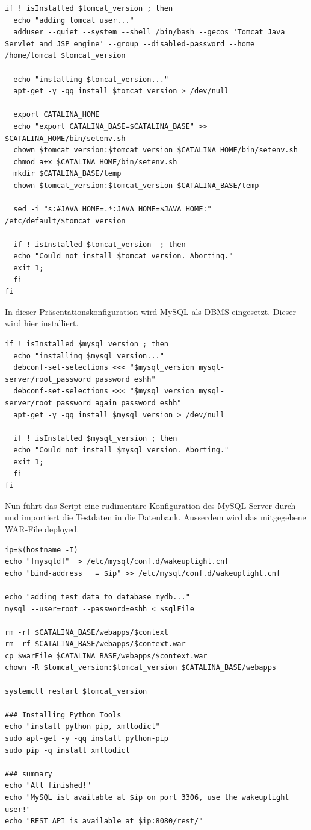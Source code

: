 \documentclass[]{article}
\begin{document}
\begin{verbatim}
if ! isInstalled $tomcat_version ; then
  echo "adding tomcat user..."
  adduser --quiet --system --shell /bin/bash --gecos 'Tomcat Java Servlet and JSP engine' --group --disabled-password --home /home/tomcat $tomcat_version

  echo "installing $tomcat_version..."
  apt-get -y -qq install $tomcat_version > /dev/null

  export CATALINA_HOME
  echo "export CATALINA_BASE=$CATALINA_BASE" >> $CATALINA_HOME/bin/setenv.sh
  chown $tomcat_version:$tomcat_version $CATALINA_HOME/bin/setenv.sh
  chmod a+x $CATALINA_HOME/bin/setenv.sh
  mkdir $CATALINA_BASE/temp
  chown $tomcat_version:$tomcat_version $CATALINA_BASE/temp

  sed -i "s:#JAVA_HOME=.*:JAVA_HOME=$JAVA_HOME:" /etc/default/$tomcat_version

  if ! isInstalled $tomcat_version  ; then
  echo "Could not install $tomcat_version. Aborting."
  exit 1; 
  fi
fi
\end{verbatim}

In dieser Präsentationskonfiguration wird MySQL als DBMS eingesetzt.
Dieser wird hier installiert.

\begin{verbatim}
if ! isInstalled $mysql_version ; then
  echo "installing $mysql_version..."
  debconf-set-selections <<< "$mysql_version mysql-server/root_password password eshh"
  debconf-set-selections <<< "$mysql_version mysql-server/root_password_again password eshh"
  apt-get -y -qq install $mysql_version > /dev/null

  if ! isInstalled $mysql_version ; then
  echo "Could not install $mysql_version. Aborting."
  exit 1; 
  fi
fi
\end{verbatim}

Nun führt das Script eine rudimentäre Konfiguration des MySQL-Server
durch und importiert die Testdaten in die Datenbank. Ausserdem wird das
mitgegebene WAR-File deployed.

\begin{verbatim}
ip=$(hostname -I)
echo "[mysqld]"  > /etc/mysql/conf.d/wakeuplight.cnf
echo "bind-address   = $ip" >> /etc/mysql/conf.d/wakeuplight.cnf

echo "adding test data to database mydb..."
mysql --user=root --password=eshh < $sqlFile

rm -rf $CATALINA_BASE/webapps/$context
rm -rf $CATALINA_BASE/webapps/$context.war
cp $warFile $CATALINA_BASE/webapps/$context.war
chown -R $tomcat_version:$tomcat_version $CATALINA_BASE/webapps

systemctl restart $tomcat_version

### Installing Python Tools
echo "install python pip, xmltodict"
sudo apt-get -y -qq install python-pip
sudo pip -q install xmltodict

### summary
echo "All finished!"
echo "MySQL ist available at $ip on port 3306, use the wakeuplight user!"
echo "REST API is available at $ip:8080/rest/"
\end{verbatim}
\end{document}
